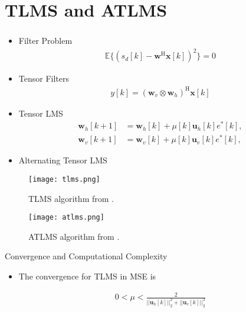\documentclass[10pt]{beamer}
\begin{document}
\section{TLMS and ATLMS}
\begin{frame}[allowframebreaks]
    \frametitle{\insertsection}
    \begin{itemize}
        \item Filter Problem 
            \begin{align}
                \mathbb{E}\{ (s_{d}[k] - \boldsymbol{w}^{\text{H}} \boldsymbol{x}[k] )^{2} \} = 0
            \end{align}
        \item Tensor Filters
            \begin{align}
                y[k] = \left(\boldsymbol{w}_{v} \otimes \boldsymbol{w}_{h} \right)^{\text{H}} \boldsymbol{x}[k]
            \end{align}
        \item Tensor LMS
        \begin{align}
            \boldsymbol{w}_{h}[k+1] &= \boldsymbol{w}_{h}[k] + \mu[k] \boldsymbol{u}_{h}[k] e^{*}[k], \\
            \boldsymbol{w}_{v}[k+1] &= \boldsymbol{w}_{v}[k] + \mu[k] \boldsymbol{u}_{v}[k] e^{*}[k],
        \end{align}
        \item Alternating Tensor LMS 
    \end{itemize}
    \framebreak
    \begin{figure}
        \centering 
        \texttt{[image: tlms.png]}
        \caption{TLMS algorithm from \cite{ribeiroseparable}.}
        \label{fig:lms_alg} 
    \end{figure}
    \begin{figure}
        \centering
        \texttt{[image: atlms.png]}
        \caption{ATLMS algorithm from \cite{ribeiroseparable}.}
        \label{fig:atlms_alg} 
    \end{figure}
    \begin{block}{Convergence and Computational Complexity}
        \begin{itemize}
            \justifying
            \item The convergence for TLMS in MSE is
            
                \begin{align}
                    0 < \mu < \frac{2}{\left|\left|\boldsymbol{u}_{h}[k]\right|\right|^{2}_{2} + \left|\left|\boldsymbol{u}_{v}[k]\right|\right|^{2}_{2}}
                \end{align}
            

\end{itemize}
\end{block}
\end{frame}
\end{document}
